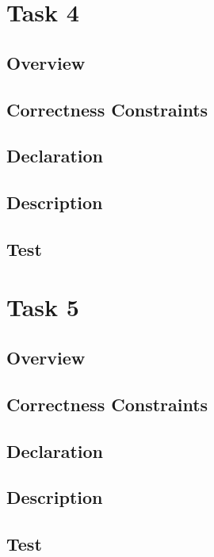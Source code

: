 \documentclass{article}
\begin{document}
\section{Task 4}
\subsection{Overview}
\subsection{Correctness Constraints}
\subsection{Declaration}
\subsection{Description}
\subsection{Test}

\section{Task 5}
\subsection{Overview}
\subsection{Correctness Constraints}
\subsection{Declaration}
\subsection{Description}
\subsection{Test}
\end{document}

